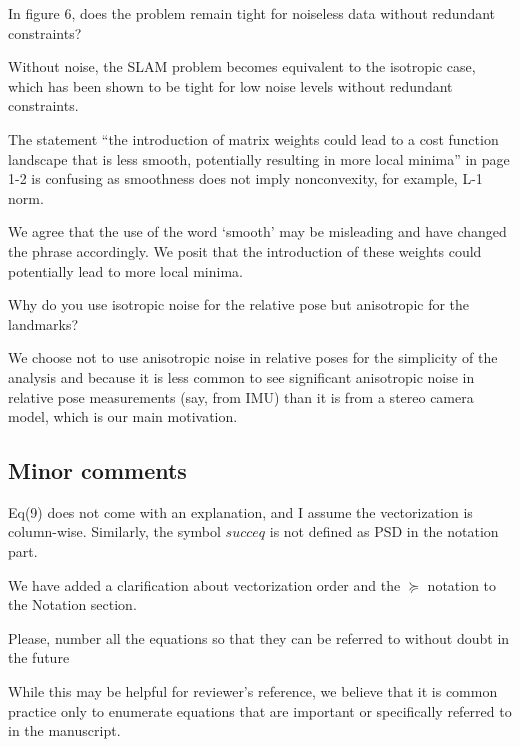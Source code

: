 In figure 6, does the problem remain tight for noiseless data without redundant constraints? 
\begin{response}
Without noise, the SLAM problem becomes equivalent to the isotropic case, which has been shown to be tight for low noise levels without redundant constraints. 
\end{response}

The statement  ``the introduction of matrix weights could lead to a cost function landscape that is less smooth, potentially resulting in more local minima'' in page 1-2 is confusing as smoothness does not imply nonconvexity, for example, L-1 norm. 
\begin{response}
We agree that the use of the word `smooth' may be misleading and have changed the phrase accordingly. We posit that the introduction of these weights could potentially lead to more local minima.
\end{response}

Why do you use isotropic noise for the relative pose but anisotropic for the landmarks? 
\begin{response}
We choose not to use anisotropic noise in relative poses for the simplicity of the analysis and because it is less common to see significant anisotropic noise in relative pose measurements (say, from IMU) than it is from a stereo camera model, which is our main motivation. 
\end{response}

\subsection*{Minor comments}

Eq(9) does not come with an explanation, and I assume the vectorization is column-wise.
Similarly, the symbol $succeq$ is not defined as PSD in the notation part.  
\begin{response}
    We have added a clarification about vectorization order and the $\succeq$ notation to the Notation section.
\end{response}

Please, number all the equations so that they can be referred to without doubt in the future
\begin{response}
    While this may be helpful for reviewer's reference, we believe that it is common practice only to enumerate equations that are important or specifically referred to in the manuscript.
\end{response}

